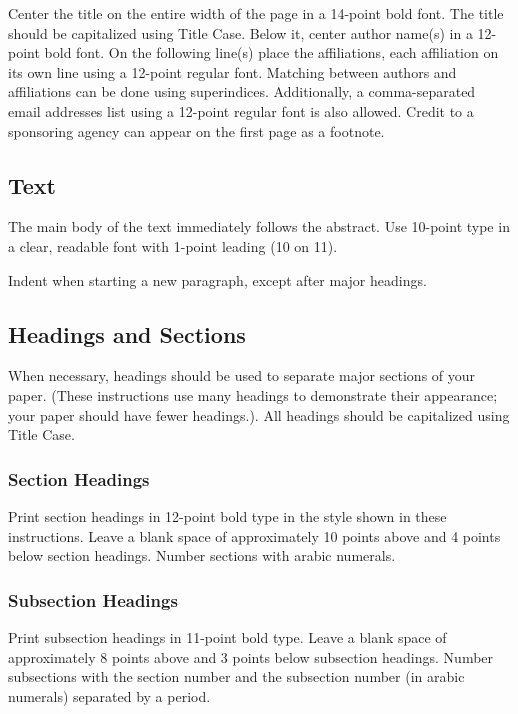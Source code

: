 \documentclass{article}
\begin{document}
Center the title on the entire width of the page in a 14-point bold
font. The title should be capitalized using Title Case. Below it, center author name(s) in a 12-point bold font. On the following line(s) place the affiliations, each affiliation on its own line using a 12-point regular font. Matching between authors and affiliations can be done using superindices. Additionally, a comma-separated email addresses list using a 12-point regular font is also allowed. Credit to a
sponsoring agency can appear on the first page as a footnote.

\subsection{Text}

The main body of the text immediately follows the abstract. Use
10-point type in a clear, readable font with 1-point leading (10 on
11).

Indent when starting a new paragraph, except after major headings.

\subsection{Headings and Sections}

When necessary, headings should be used to separate major sections of
your paper. (These instructions use many headings to demonstrate their
appearance; your paper should have fewer headings.). All headings should be capitalized using Title Case.

\subsubsection{Section Headings}

Print section headings in 12-point bold type in the style shown in
these instructions. Leave a blank space of approximately 10 points
above and 4 points below section headings.  Number sections with
arabic numerals.

\subsubsection{Subsection Headings}

Print subsection headings in 11-point bold type. Leave a blank space
of approximately 8 points above and 3 points below subsection
headings. Number subsections with the section number and the
subsection number (in arabic numerals) separated by a
period.
\end{document}
